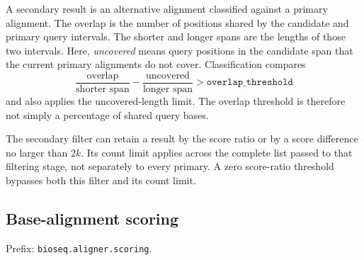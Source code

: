 A secondary result is an alternative alignment classified against a primary
alignment. The overlap is the number of positions shared by the candidate
and primary query intervals. The shorter and longer spans are the lengths of
those two intervals. Here, \emph{uncovered} means query positions in the candidate span
that the current primary alignments do not cover. Classification compares
\[
  \frac{\text{overlap}}{\text{shorter span}}
  -\frac{\text{uncovered}}{\text{longer span}}
  > \texttt{overlap\_threshold}
\]
and also applies the uncovered-length limit. The overlap threshold is therefore
not simply a percentage of shared query bases.

The secondary filter can retain a result by the score ratio or by a score
difference no larger than $2k$. Its count limit applies across the complete
list passed to that filtering stage, not separately to every primary.
A zero score-ratio threshold bypasses both this filter and its count limit.

\subsection{Base-alignment scoring}

Prefix: \nolinkurl{bioseq.aligner.scoring}.

